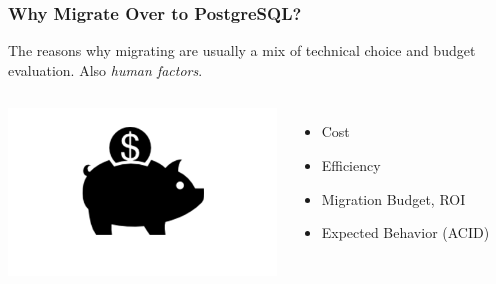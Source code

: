 \documentclass[xcolor=dvipsnames]{beamer}
\begin{document}
\begin{frame}[fragile]
  \frametitle{Why Migrate Over to PostgreSQL?}

  The reasons why migrating are usually a mix of technical choice and budget
  evaluation. Also \textit{human factors}.
  \vfill
  
  \begin{columns}[c]
    \begin{center}
      \includegraphics[height=12em]{cost_effective_black.png}
    \end{center}

    \begin{itemize}
    \item Cost
    \item Efficiency
    \item Migration Budget, ROI
    \item Expected Behavior (ACID)
    \end{itemize}
  \end{columns}
\end{frame}
\end{document}
